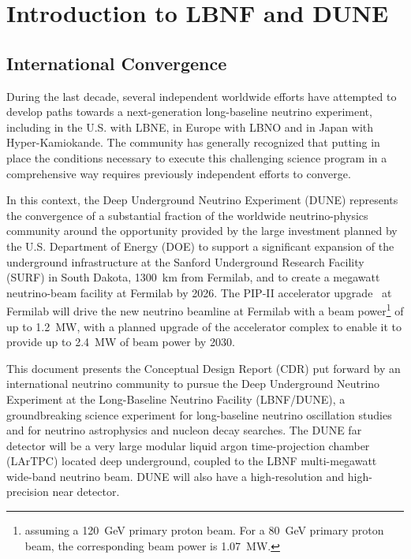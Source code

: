 \chapter{Introduction to LBNF and DUNE}
\label{ch:project-overview}

\section{International Convergence}

During the last decade, several independent worldwide efforts have attempted to develop paths towards a next-generation long-baseline neutrino experiment, including in the U.S. with LBNE, in Europe with LBNO and in Japan with Hyper-Kamiokande. The community has generally recognized that putting in place  
the conditions necessary to 
execute this challenging science program in a comprehensive way requires previously independent efforts to converge. 

In this context, the Deep Underground Neutrino Experiment (DUNE) represents the convergence of a substantial fraction of the worldwide neutrino-physics community around the 
opportunity provided by the 
large investment planned by the U.S. Department of Energy (DOE) to support 
a significant expansion of the underground infrastructure at the Sanford Underground Research 
Facility (SURF) in South Dakota, \SI{1300}{\km} from Fermilab, and to create a megawatt neutrino-beam facility at Fermilab by 2026.  The PIP-II accelerator upgrade~\cite{pip2-2013} at 
Fermilab will drive the new neutrino beamline at Fermilab with a beam power\footnote{assuming a \SI{120}{\GeV} primary proton beam. For a \SI{80}{\GeV} primary proton beam, the corresponding beam power is \SI{1.07}{\MW}.} of up to \SI{1.2}{\MW}, with a planned upgrade 
of the accelerator complex to enable it to provide up to \SI{2.4}{\MW} of beam power by 2030.  

This document presents 
the Conceptual Design Report (CDR) put forward by an international neutrino community to pursue 
the Deep Underground Neutrino Experiment at the Long-Baseline Neutrino Facility (LBNF/DUNE),
a groundbreaking science experiment for long-baseline neutrino oscillation studies and for neutrino astrophysics and nucleon decay searches. The DUNE far detector will be a very large modular liquid argon time-projection chamber (LArTPC) located deep underground, coupled to the LBNF multi-megawatt   
wide-band neutrino beam.   DUNE will also have a high-resolution and high-precision near detector.

